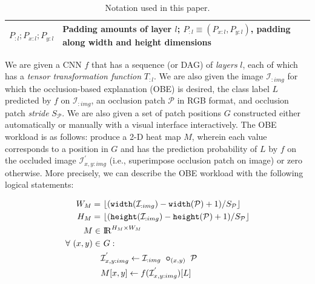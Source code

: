 \begin{table}[t]
{\begin{tabular}{p{2cm}p{7.5cm}}
    \midrule
    $P_{:l}; P_{x:l}; P_{y:l}$ & Padding amounts of layer $l$; $P_{:l} \equiv (P_{x:l}, P_{y:l})$, padding along width and height dimensions\\
    \bottomrule
  \end{tabular}}
    \caption{Notation used in this paper.}
\label{table:preliminaries_symbols}
\vspace{-6mm}
\end{table}

We are given a CNN $f$ that has a sequence (or DAG) of \textit{layers} $l$, each of which has a \textit{tensor transformation function} $T_{:l}$. We are also given the image $\mathcal{I}_{:img}$ for which the occlusion-based explanation (OBE) is desired, the class label $L$ predicted by $f$ on $\mathcal{I}_{:img}$, an occlusion patch $\mathcal{P}$ in RGB format, and occlusion patch \textit{stride} $S_{\mathcal{P}}$. We are also given a set of patch positions $G$ constructed either automatically or manually with a visual interface interactively. The OBE workload is as follows: produce a 2-D heat map $M$, wherein each value corresponds to a position in $G$ and has the prediction probability of $L$ by $f$ on the occluded image $\mathcal{I}^{'}_{x,y:img}$ (i.e., superimpose occlusion patch on image) or zero otherwise.
More precisely, we can describe the OBE workload with the following logical statements:

\vspace{-2mm}
\begin{align}
\label{eqn:mheight}
W_M =&~ \lfloor(\texttt{width}(\mathcal{I}_{:img}) - \texttt{width}(\mathcal{P}) + 1)/S_\mathcal{P}\rfloor\\
\label{eqn:mwidth}
H_M =&~ \lfloor(\texttt{height}(\mathcal{I}_{:img}) - \texttt{height}(\mathcal{P}) + 1)/S_\mathcal{P}\rfloor\\
M \in&~ \mathcal{\rm I\!R}^{H_M \times W_M}\\
\forall~ (x,y) \in&~ G:\\
\label{eqn:patchimpose}
& \mathcal{I}^{'}_{x,y:img} \leftarrow \mathcal{I}_{:img} ~ \bm\circ_{(x,y)} ~ \mathcal{P} \\
\label{eqn:outputval}
& M[x,y] \leftarrow f(\mathcal{I}^{'}_{x,y:img})[L]
\end{align}

